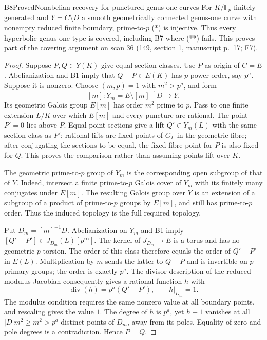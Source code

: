 \begin{result}{B8}{Proved}{Nonabelian recovery for punctured genus-one curves}
\label{res:B8}
For $K/\mathbb F_p$ finitely generated and $Y=C\setminus D$ a smooth
geometrically connected genus-one curve with nonempty reduced finite
boundary, prime-to-$p$ (*) is injective. Thus every hyperbolic genus-one
type is covered, including B7 where (**) fails. This proves part of
the covering argument on scan 36 (149, section 1, manuscript p.~17; F7).
\end{result}
\begin{proof}
Suppose $P,Q\in Y(K)$ give equal section classes. Use $P$ as origin
of $C=E$. Abelianization and B1 imply that $Q-P\in E(K)$ has
$p$-power order, say $p^a$. Suppose it is nonzero. Choose $(m,p)=1$
with $m^2>p^a$, and form
\[
 [m]:Y_m=E\setminus[m]^{-1}D\longrightarrow Y.
\]
Its geometric Galois group $E[m]$ has order $m^2$ prime to $p$.
Pass to one finite extension $L/K$ over which $E[m]$ and every
puncture are rational. The point $P'=0$ lies above $P$. Equal point
sections give a lift $Q'\in Y_m(L)$ with the same section class as
$P'$: rational lifts are fixed points of $G_L$ in the geometric fibre;
after conjugating the sections to be equal, the fixed fibre point for
$P$ is also fixed for $Q$. This proves the comparison rather than
assuming points lift over $K$.

The geometric prime-to-$p$ group of $Y_m$ is the corresponding open
subgroup of that of $Y$. Indeed, intersect a finite prime-to-$p$
Galois cover of $Y_m$ with its finitely many conjugates under $E[m]$.
The resulting Galois group over $Y$ is an extension of a subgroup of
a product of prime-to-$p$ groups by $E[m]$, and still has prime-to-$p$
order. Thus the induced topology is the full required topology.

Put $D_m=[m]^{-1}D$. Abelianization on $Y_m$ and B1 imply
$[Q'-P']\in J_{D_m}(L)[p^\infty]$. The kernel of $J_{D_m}\to E$
is a torus and has no geometric $p$-torsion. The order of this class
therefore equals the order of $Q'-P'$ in $E(L)$. Multiplication by
$m$ sends the latter to $Q-P$ and is invertible on $p$-primary groups;
the order is exactly $p^a$. The divisor description of the reduced
modulus Jacobian consequently gives a rational function $h$ with
\[
 \operatorname{div}(h)=p^a(Q'-P'),\qquad h|_{D_m}=1.
\]
The modulus condition requires the same nonzero value at all boundary
points, and rescaling gives the value $1$. The degree of $h$ is $p^a$,
yet $h-1$ vanishes at all $|D|m^2\geq m^2>p^a$ distinct points of
$D_m$, away from its poles. Equality of zero and pole degrees is a
contradiction. Hence $P=Q$.
\end{proof}


